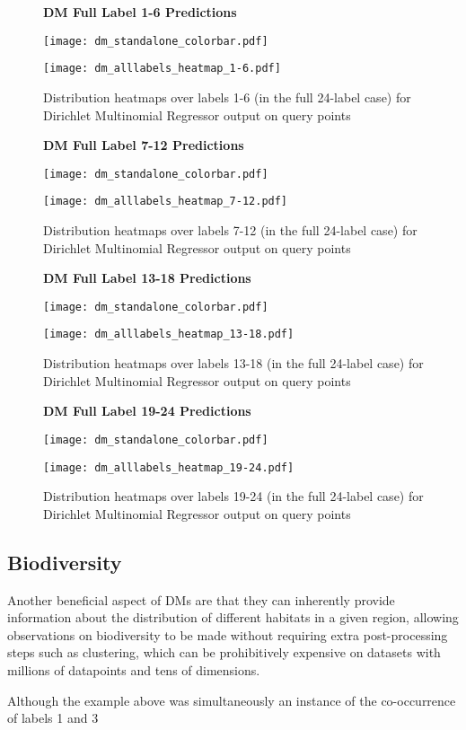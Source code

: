 \begin{figure}[H]
    \textbf{DM Full Label 1-6 Predictions}
    \centerline{\texttt{[image: dm\_standalone\_colorbar.pdf]}}
    \centerline{\texttt{[image: dm\_alllabels\_heatmap\_1-6.pdf]}}
    \caption{Distribution heatmaps over labels 1-6 (in the full 24-label case) for Dirichlet Multinomial Regressor output on query points}
    \label{fig:dm_24-1_label_heatmap}
    \hfill
\end{figure}
\begin{figure}[H]
    \textbf{DM Full Label 7-12 Predictions}
    \centerline{\texttt{[image: dm\_standalone\_colorbar.pdf]}}
    \centerline{\texttt{[image: dm\_alllabels\_heatmap\_7-12.pdf]}}
    \caption{Distribution heatmaps over labels 7-12 (in the full 24-label case) for Dirichlet Multinomial Regressor output on query points}
    \label{fig:dm_24-2_label_heatmap}
    \hfill
\end{figure}
\begin{figure}[H]
    \textbf{DM Full Label 13-18 Predictions}
    \centerline{\texttt{[image: dm\_standalone\_colorbar.pdf]}}
    \centerline{\texttt{[image: dm\_alllabels\_heatmap\_13-18.pdf]}}
    \caption{Distribution heatmaps over labels 13-18 (in the full 24-label case) for Dirichlet Multinomial Regressor output on query points}
    \label{fig:dm_24-3_label_heatmap}
    \hfill
\end{figure}
\begin{figure}[H]
    \textbf{DM Full Label 19-24 Predictions}
    \centerline{\texttt{[image: dm\_standalone\_colorbar.pdf]}}
    \centerline{\texttt{[image: dm\_alllabels\_heatmap\_19-24.pdf]}}
    \caption{Distribution heatmaps over labels 19-24 (in the full 24-label case) for Dirichlet Multinomial Regressor output on query points}
    \label{fig:dm_24-4_label_heatmap}
    \hfill
\end{figure}

\subsection{Biodiversity}

Another beneficial aspect of DMs are that they can inherently provide information about the distribution of different habitats in a given region, allowing observations on biodiversity to be made without requiring extra post-processing steps such as clustering, which can be prohibitively expensive on datasets with millions of datapoints and tens of dimensions.

Although the example above was simultaneously an instance of the co-occurrence of labels 1 and 3
